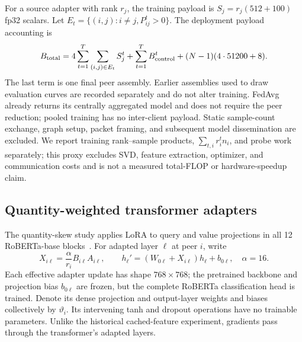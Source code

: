 \documentclass[11pt]{article}
\begin{document}
For a source adapter with rank $r_j$, the training payload is $S_j=r_j(512+100)$ fp32 scalars. Let $E_t=\{(i,j):i\ne j,P_{ij}^t>0\}$. The deployment payload accounting is
\begin{equation}
 B_{\rm total}=4\sum_{t=1}^{T}\sum_{(i,j)\in E_t}S_j^t
 +\sum_{t=1}^{T}B_{\rm control}^t+(N-1)(4\cdot51200+8).
 \label{eq:total-cost}
\end{equation}
The last term is one final peer assembly. Earlier assemblies used to draw evaluation curves are recorded separately and do not alter training. FedAvg already returns its centrally aggregated model and does not require the peer reduction; pooled training has no inter-client payload. Static sample-count exchange, graph setup, packet framing, and subsequent model dissemination are excluded. We report training rank--sample products, $\sum_{t,i}r_i^tn_i$, and probe work separately; this proxy excludes SVD, feature extraction, optimizer, and communication costs and is not a measured total-FLOP or hardware-speedup claim.

\subsection{Quantity-weighted transformer adapters}
\label{sec:quantity-method}
The quantity-skew study applies LoRA to query and value projections in all 12 RoBERTa-base blocks~\citep{liu2019roberta}. For adapted layer $\ell$ at peer $i$, write
\begin{equation}
 X_{i\ell}=\frac{\alpha}{r_i}B_{i\ell}A_{i\ell},\qquad
 h_\ell'=\left(W_{0\ell}+X_{i\ell}\right)h_\ell+b_{0\ell},
 \quad \alpha=16.
 \label{eq:transformer-adapter}
\end{equation}
Each effective adapter update has shape $768\times768$; the pretrained backbone and projection bias $b_{0\ell}$ are frozen, but the complete RoBERTa classification head is trained. Denote its dense projection and output-layer weights and biases collectively by $\vartheta_i$. Its intervening tanh and dropout operations have no trainable parameters. Unlike the historical cached-feature experiment, gradients pass through the transformer's adapted layers.
\end{document}
